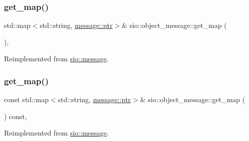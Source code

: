 \mbox{\label{classsio_1_1object__message_ac024fab0eb24248150ab318a4b937b4e}} 
\subsubsection{\texorpdfstring{get\+\_\+map()}{get\_map()}\hspace{0.1cm}{\footnotesize\ttfamily [1/2]}}
{\footnotesize\ttfamily std\+::map$<$std\+::string, \hyperlink{classsio_1_1message_a6340b6fef57e4516eb17928b1885a615}{message\+::ptr}$>$\& sio\+::object\+\_\+message\+::get\+\_\+map (\begin{DoxyParamCaption}{ }\end{DoxyParamCaption})\hspace{0.3cm}{\ttfamily [inline]}, {\ttfamily [virtual]}}



Reimplemented from \hyperlink{classsio_1_1message_a6ca4aee4616aa9dfde4de317d5efd125}{sio\+::message}.

\mbox{\label{classsio_1_1object__message_a35d7f1d654b2a3b753ac01444635203e}} 
\subsubsection{\texorpdfstring{get\+\_\+map()}{get\_map()}\hspace{0.1cm}{\footnotesize\ttfamily [2/2]}}
{\footnotesize\ttfamily const std\+::map$<$std\+::string, \hyperlink{classsio_1_1message_a6340b6fef57e4516eb17928b1885a615}{message\+::ptr}$>$\& sio\+::object\+\_\+message\+::get\+\_\+map (\begin{DoxyParamCaption}{ }\end{DoxyParamCaption}) const\hspace{0.3cm}{\ttfamily [inline]}, {\ttfamily [virtual]}}



Reimplemented from \hyperlink{classsio_1_1message_a954a981a468fcea36ff19cce6ae7fd5e}{sio\+::message}.

\mbox{\label{classsio_1_1object__message_a2afede757162e3c5e70919a47da9d4f0}} 
